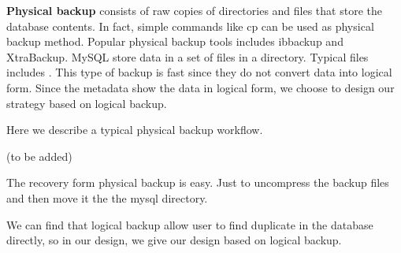 
 





\textbf{Physical backup} consists of raw copies of directories and files that store the database contents\citep{mysqlbackupdocumentation}. In fact, simple commands like cp can be used as physical backup method. Popular physical backup tools includes ibbackup and XtraBackup\citep{xtrabackup}. MySQL store data in a set of files in a directory. Typical files includes .
This type of backup is fast since they do not convert data into logical form. Since the metadata show the data in logical form, we choose to design our strategy based on logical backup. 


Here we describe a typical physical backup workflow. 

(to be added)

The recovery form physical backup is easy. Just to uncompress the backup files and then move it the the mysql directory. 




We can find that logical backup allow user to find duplicate in the database directly, so in our design, we give our design based on logical backup.



